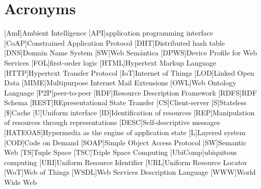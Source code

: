 


\chapter*{Acronyms}

\begin{acronym}
  [AmI]{Ambient Intelligence}
  [API]{application programming interface}
  [CoAP]{Constrained Application Protocol}
  [DHT]{Distributed hash table}
  [DNS]{Domain Name System}
  [SW]{Web Semántica}
  [DPWS]{Device Profile for Web Services}
  [FOL]{first-order logic}
  [HTML]{Hypertext Markup Language}
  [HTTP]{Hypertext Transfer Protocol}
  [IoT]{Internet of Things}
  [LOD]{Linked Open Data}
  [MIME]{Multipurpose Internet Mail Extensions}
  [OWL]{Web Ontology Language}
  [P2P]{peer-to-peer}
  [RDF]{Resource Description Framework}
  [RDFS]{RDF Schema}
  [REST]{REpresentational State Transfer} %
    [CS]{Client-server}
    [S]{Stateless}
    [\$]{Cache}
    [U]{Uniform interface}
    [ID]{Identification of resources}
    [REP]{Manipulation of resources through representations}
    [DESC]{Self-descriptive messages}
    [HATEOAS]{Hypermedia as the engine of application state}
    [L]{Layered system}
    [COD]{Code on Demand} %
  [SOAP]{Simple Object Access Protocol}
  [SW]{Semantic Web}
  [TS]{Tuple Space}
  [TSC]{Triple Space Computing}
  [UbiComp]{ubiquitous computing}
  [URI]{Uniform Resource Identifier}
  [URL]{Uniform Resource Locator}
  [WoT]{Web of Things}
  [WSDL]{Web Services Description Language}
  [WWW]{World Wide Web} %
\end{acronym}

